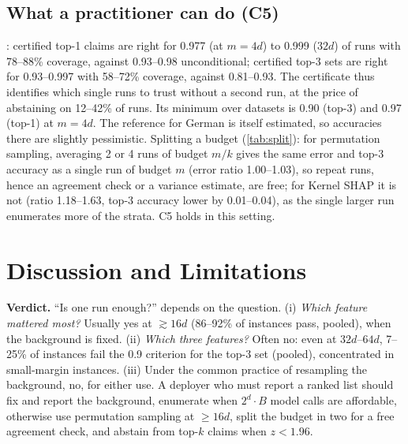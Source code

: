 \documentclass{article}
\begin{document}
\subsection{What a practitioner can do (C5)}\label{sec:cert}
\begin{table}[t]
\caption{Single-run certificate ($z\ge1.96$) from permutation runs, mean over four datasets, runs $\times$ instances $\times$ models pooled. acc.: fraction of runs whose top-1 (top-3 set) equals the exact (German: high-budget) reference; coverage: fraction certified; brackets: minimum over datasets.}\label{tab:cert}
\centering\scriptsize\setlength{\tabcolsep}{2.5pt}

\end{table}
: certified top-1 claims are right for 0.977 (at $m=4d$) to 0.999 ($32d$) of runs with 78--88\% coverage, against 0.93--0.98 unconditional; certified top-3 sets are right for 0.93--0.997 with 58--72\% coverage, against 0.81--0.93. The certificate thus identifies which single runs to trust without a second run, at the price of abstaining on 12--42\% of runs. Its minimum over datasets is 0.90 (top-3) and 0.97 (top-1) at $m=4d$. The reference for German is itself estimated, so accuracies there are slightly pessimistic. Splitting a budget (\cref{tab:split}): for permutation sampling, averaging 2 or 4 runs of budget $m/k$ gives the same error and top-3 accuracy as a single run of budget $m$ (error ratio 1.00--1.03), so repeat runs, hence an agreement check or a variance estimate, are free; for Kernel SHAP it is not (ratio 1.18--1.63, top-3 accuracy lower by 0.01--0.04), as the single larger run enumerates more of the strata. C5 holds in this setting.
\begin{table}[t]
\caption{Averaging $k$ runs of budget $m/k$ vs.\ one run of budget $m$ (pooled over cells where defined): median over cells of the per-cell median ratio of relative errors to the reference; mean top-3 accuracy.}\label{tab:split}
\centering\scriptsize\setlength{\tabcolsep}{3pt}

\end{table}

\section{Discussion and Limitations}\label{sec:limits}
\textbf{Verdict.} ``Is one run enough?'' depends on the question. (i) \emph{Which feature mattered most?} Usually yes at $\gtrsim16d$ (86--92\% of instances pass, pooled), when the background is fixed. (ii) \emph{Which three features?} Often no: even at $32d$--$64d$, 7--25\% of instances fail the 0.9 criterion for the top-3 set (pooled), concentrated in small-margin instances. (iii) Under the common practice of resampling the background, no, for either use. A deployer who must report a ranked list should fix and report the background, enumerate when $2^d\cdot B$ model calls are affordable, otherwise use permutation sampling at $\ge16d$, split the budget in two for a free agreement check, and abstain from top-$k$ claims when $z<1.96$.
\end{document}
